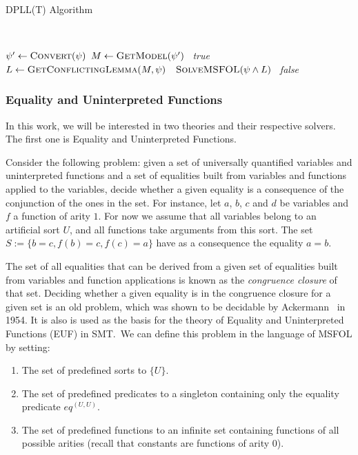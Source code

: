 \begin{algorithm}[H]
\caption{DPLL(T) Algorithm}~\label{dpllTAlgo}
\begin{algorithmic}[1]
\State $\psi' \gets \Call{Convert}{\psi}$ 
  \State $M \gets \Call{GetModel}{\psi'}$
   
    \State~\Return \textit{true}
  \Else
    \State $L \gets \Call{GetConflictingLemma}{M, \psi}$
    \State~\Return $\Call{SolveMSFOL}{\psi \wedge L}$
  \EndIf
\Else
  \State~\Return \textit{false}
\EndIf


\EndFunction
\end{algorithmic}
\end{algorithm}

\subsubsection{Equality and Uninterpreted Functions}

In this work, we will be interested in two theories and their respective solvers. The first one is Equality and Uninterpreted Functions.

Consider the following problem: given a set of universally quantified variables and uninterpreted functions and a set of equalities built from variables and functions applied to the variables, decide whether a given equality is a consequence of the conjunction of the ones in the set. For instance, let $a$, $b$, $c$ and $d$ be variables and $f$ a function of arity $1$. For now we assume that all variables belong to an artificial sort $U$, and all functions take arguments from this sort. The set $S := \{b = c, f(b) = c, f(c) = a\}$ have as a consequence the equality $a = b$.

The set of all equalities that can be derived from a given set of equalities built from variables and function applications is known as the \textit{congruence closure} of that set. Deciding whether a given equality is in the congruence closure for a given set is an old problem, which was shown to be decidable by Ackermann~\cite{ack_cong} in 1954. It is also is used as the basis for the theory of Equality and Uninterpreted Functions (EUF) in SMT.~We can define this problem in the language of MSFOL by setting:
\begin{enumerate}
  \item The set of predefined sorts to $\{U\}$.
  \item The set of predefined predicates to a singleton containing only the equality predicate $eq^{(U, U)}$.
  \item The set of predefined functions to an infinite set containing functions of all possible arities (recall that constants are functions of arity $0$). 
\end{enumerate}

